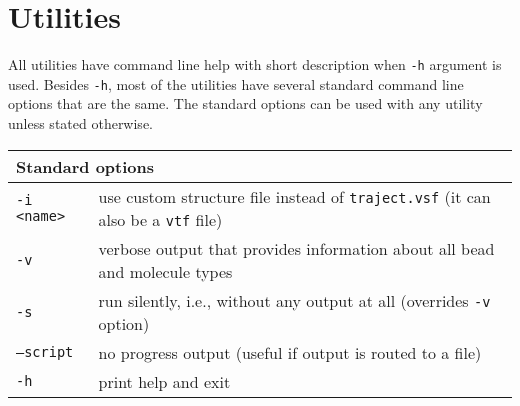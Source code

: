 \chapter{Utilities} \label{chap:Utils}

All utilities have command line help with short description when
\texttt{-h} argument is used. Besides \texttt{-h}, most of the utilities
have several standard command line options that are the same. The standard
options can be used with any utility unless stated otherwise.

\vspace{1em}
\noindent
\begin{tabular}{p{}p{}}
  \toprule
  \multicolumn{2}{l}{Standard options} \\
  \midrule
  \texttt{-i <name>} & use custom structure file instead of
    \texttt{traject.vsf} (it can also be a \texttt{vtf} file) \\
  \texttt{-v}        & verbose output that provides information about all
    bead and molecule types \\
  \texttt{-s}        & run silently, i.e., without any output at all
    (overrides \texttt{-v} option) \\
  \texttt{--script}  & no progress output (useful if output is routed to a
    file) \\
  \texttt{-h}        & print help and exit \\
  \bottomrule
\end{tabular}












%













